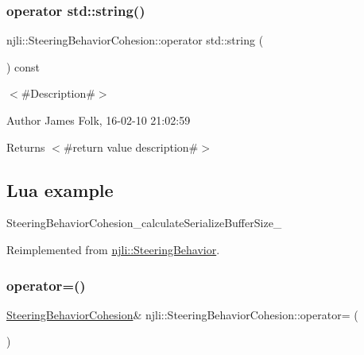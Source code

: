 \subsubsection{\texorpdfstring{operator std\+::string()}{operator std::string()}}
{\footnotesize\ttfamily njli\+::\+Steering\+Behavior\+Cohesion\+::operator std\+::string (\begin{DoxyParamCaption}{ }\end{DoxyParamCaption}) const\hspace{0.3cm}{\ttfamily [virtual]}}



$<$\#\+Description\#$>$ 

\begin{DoxyAuthor}{Author}
James Folk, 16-\/02-\/10 21\+:02\+:59
\end{DoxyAuthor}
\begin{DoxyReturn}{Returns}
$<$\#return value description\#$>$
\end{DoxyReturn}
\hypertarget{classnjli_1_1_steering_behavior_wander_ex1}{}\subsection{Lua example}\label{classnjli_1_1_steering_behavior_wander_ex1}

\begin{DoxyCodeInclude}
\end{DoxyCodeInclude}
Steering\+Behavior\+Cohesion\+\_\+calculate\+Serialize\+Buffer\+Size\+\_\+ 

Reimplemented from \mbox{\hyperlink{classnjli_1_1_steering_behavior_acd7af46e42a8a3fc1208a47f50836ac8}{njli\+::\+Steering\+Behavior}}.

\mbox{\label{classnjli_1_1_steering_behavior_cohesion_a9c73dffbdbdbb311e25197caedfe2ba3}} 
\subsubsection{\texorpdfstring{operator=()}{operator=()}}
{\footnotesize\ttfamily \mbox{\hyperlink{classnjli_1_1_steering_behavior_cohesion}{Steering\+Behavior\+Cohesion}}\& njli\+::\+Steering\+Behavior\+Cohesion\+::operator= (\begin{DoxyParamCaption}\item[{const \mbox{\hyperlink{classnjli_1_1_steering_behavior_cohesion}{Steering\+Behavior\+Cohesion}} \&}]{ }\end{DoxyParamCaption})\hspace{0.3cm}{\ttfamily [protected]}}

